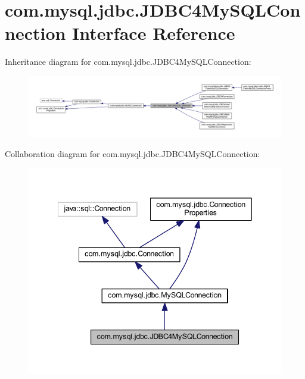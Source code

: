 \hypertarget{interfacecom_1_1mysql_1_1jdbc_1_1_j_d_b_c4_my_s_q_l_connection}{}\section{com.\+mysql.\+jdbc.\+J\+D\+B\+C4\+My\+S\+Q\+L\+Connection Interface Reference}
\label{interfacecom_1_1mysql_1_1jdbc_1_1_j_d_b_c4_my_s_q_l_connection}


Inheritance diagram for com.\+mysql.\+jdbc.\+J\+D\+B\+C4\+My\+S\+Q\+L\+Connection\+:
\nopagebreak
\begin{figure}[H]
\begin{center}
\leavevmode
\includegraphics[width=350pt]{interfacecom_1_1mysql_1_1jdbc_1_1_j_d_b_c4_my_s_q_l_connection__inherit__graph}
\end{center}
\end{figure}


Collaboration diagram for com.\+mysql.\+jdbc.\+J\+D\+B\+C4\+My\+S\+Q\+L\+Connection\+:
\nopagebreak
\begin{figure}[H]
\begin{center}
\leavevmode
\includegraphics[width=342pt]{interfacecom_1_1mysql_1_1jdbc_1_1_j_d_b_c4_my_s_q_l_connection__coll__graph}
\end{center}
\end{figure}
